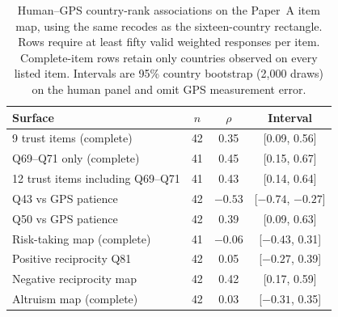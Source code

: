 \begin{table}[htbp]\centering\small
\caption{Human--GPS country-rank associations on the Paper~A item map, using the same recodes as the sixteen-country rectangle. Rows require at least fifty valid weighted responses per item. Complete-item rows retain only countries observed on every listed item. Intervals are 95\% country bootstrap (2,000 draws) on the human panel and omit GPS measurement error.}\label{tab:human42}
\begin{tabular}{lccc}\toprule
Surface & $n$ & $\rho$ & Interval\\\midrule
9 trust items (complete) & 42 & 0.35 & [0.09, 0.56] \\
Q69--Q71 only (complete) & 41 & 0.45 & [0.15, 0.67] \\
12 trust items including Q69--Q71 & 41 & 0.43 & [0.14, 0.64] \\
Q43 vs GPS patience & 42 & $-0.53$ & [$-0.74$, $-0.27$] \\
Q50 vs GPS patience & 42 & 0.39 & [0.09, 0.63] \\
Risk-taking map (complete) & 41 & $-0.06$ & [$-0.43$, 0.31] \\
Positive reciprocity Q81 & 42 & 0.05 & [$-0.27$, 0.39] \\
Negative reciprocity map & 42 & 0.42 & [0.17, 0.59] \\
Altruism map (complete) & 42 & 0.03 & [$-0.31$, 0.35] \\
\bottomrule
\end{tabular}
\end{table}
